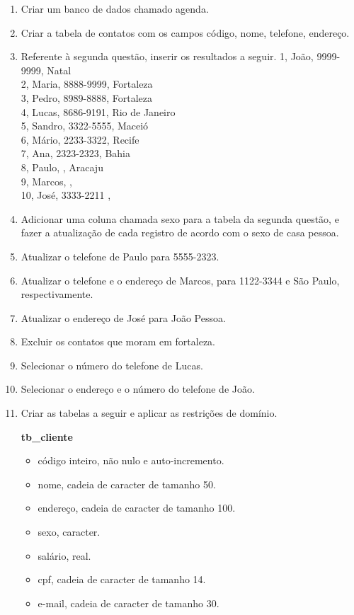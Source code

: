 \documentclass[11pt]{article}
\begin{document}
\begin{enumerate}
	\item Criar um banco de dados chamado agenda.
	
	\item Criar a tabela de contatos com os campos código, nome, telefone, endereço.
	
	\item Referente à segunda questão, inserir os resultados a seguir.
	1, João, 9999-9999, Natal\\
	2, Maria, 8888-9999, Fortaleza\\
	3, Pedro, 8989-8888, Fortaleza\\
	4, Lucas, 8686-9191, Rio de Janeiro\\
	5, Sandro, 3322-5555, Maceió\\
	6, Mário, 2233-3322, Recife\\
	7, Ana, 2323-2323, Bahia\\
	8, Paulo, , Aracaju\\
	9, Marcos, ,\\
	10, José, 3333-2211 ,\\
	
	\item Adicionar uma coluna chamada sexo para a tabela da segunda questão, e fazer a atualização de
	cada registro de acordo com o sexo de casa pessoa.
	
	\item Atualizar o telefone de Paulo para 5555-2323.
	
	\item Atualizar o telefone e o endereço de Marcos, para 1122-3344 e São Paulo, respectivamente.
	
	\item Atualizar o endereço de José para João Pessoa.
	
	\item Excluir os contatos que moram em fortaleza.
	
	\item Selecionar o número do telefone de Lucas.
	
	\item Selecionar o endereço e o número do telefone de João.

	\item Criar as tabelas a seguir e aplicar as restrições de domínio.
	
	\textbf{tb\_cliente}
	\begin{itemize}
		\item código inteiro, não nulo e auto-incremento.
		\item nome, cadeia de caracter de tamanho 50.
		\item endereço, cadeia de caracter de tamanho 100.
		\item sexo, caracter.
		\item salário, real.
		\item cpf, cadeia de caracter de tamanho 14.
		\item e-mail, cadeia de caracter de tamanho 30.
	\end{itemize}
	

\end{enumerate}
\end{document}

